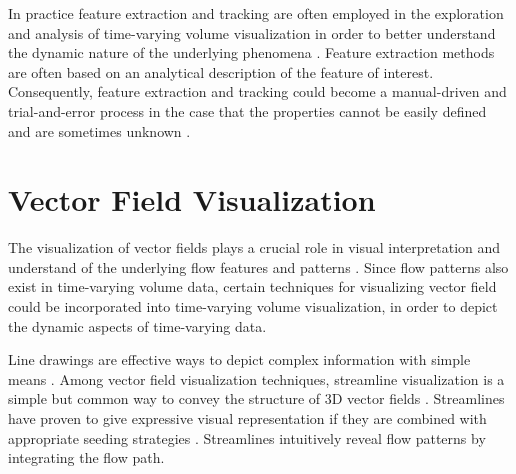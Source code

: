 In practice feature extraction and tracking are often employed in the exploration and analysis of time-varying volume visualization in order to better understand the dynamic nature of the underlying phenomena \cite{tzeng_intelligent_2005} \cite{woodring_multiscale_2009} \cite{lee_visualizing_2009} \cite{gu_transgraph_2011}.
Feature extraction methods are often based on an analytical description of the feature of interest. Consequently, feature extraction and tracking could become a manual-driven and trial-and-error process in the case that the properties cannot be easily defined and are sometimes unknown \cite{ma_machine_2007}.

\cite{ma_machine_2007} \cite{wang_information_2008}
%
\cite{caban_texture-based_2007}
%
\cite{widanagamaachchi_interactive_2012} \cite{ozer_group_2012}
\cite{hsieh_feature_2013}

\section{Vector Field Visualization}
The visualization of vector fields plays a crucial role in visual interpretation and understand of the underlying flow features and patterns \cite{kuhn_clustering-based_2011} \cite{ma_coherent_2013}. Since flow patterns also exist in time-varying volume data, certain techniques for visualizing vector field could be incorporated into time-varying volume visualization, in order to depict the dynamic aspects of time-varying data.

Line drawings are effective ways to depict complex information with simple means \cite{benard_state_art_2011}. Among vector field visualization techniques, streamline visualization is a simple but common way to convey the structure of 3D vector fields \cite{chen_illustrative_2011}. Streamlines have proven to give expressive visual representation if they are combined with appropriate seeding strategies \cite{annen_vector_2008}. Streamlines intuitively reveal flow patterns by integrating the flow path.

